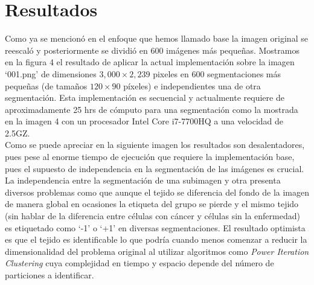 \documentclass[conference]{IEEEtran}
\begin{document}
\newpage
\section{Resultados}
Como ya se mencionó en el enfoque que hemos llamado base la imagen original se reescaló y posteriormente se dividió en 600 imágenes más pequeñas. Mostramos en la figura 4 el resultado de aplicar la actual implementación sobre la imagen ‘001.png’ de dimensiones $3,000 \times 2,239$ pixeles en 600 segmentaciones más pequeñas (de tamaños $120 \times 90$ píxeles) e independientes una de otra segmentación. Esta implementación es secuencial y actualmente requiere de aproximadamente 25 hrs de cómputo para una segmentación como la mostrada en la imagen 4 con un procesador Intel Core i7-7700HQ a una velocidad de 2.5GZ.\\

Como se puede apreciar en la siguiente imagen los resultados son desalentadores, pues pese al enorme tiempo de ejecución que requiere la implementación base, pues el supuesto de independencia en la segmentación de las imágenes es crucial. La independencia entre la segmentación de una subimagen y otra presenta diversos problemas como que aunque el tejido se diferencia del fondo de la imagen de manera global en ocasiones la etiqueta del grupo se pierde y el mismo tejido (sin hablar de la diferencia entre células con cáncer y células sin la enfermedad) es etiquetado como ‘-1’ o ‘+1’ en diversas segmentaciones. El resultado optimista es que el tejido es identificable lo que podría cuando menos comenzar a reducir la dimensionalidad del problema original al utilizar algoritmos como \textit{Power Iteration Clustering} cuya complejidad en tiempo y espacio depende del número de particiones a identificar.
\end{document}
